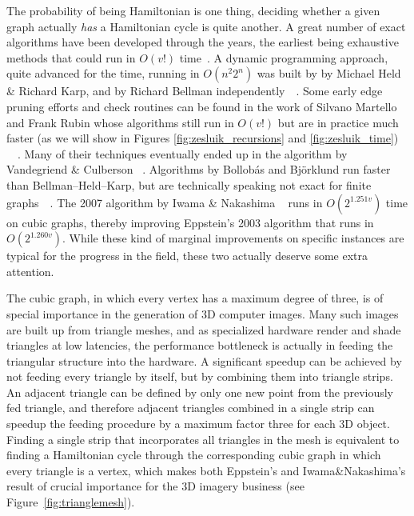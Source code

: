 \documentclass[10pt,conference,compsocconf]{IEEEtran}
\begin{document}
The probability of being Hamiltonian is one thing, deciding whether a given graph actually \textit{has} a Hamiltonian cycle is quite another. A great number of exact algorithms have been developed through the years, the earliest being exhaustive methods that could run in $O(v!)$ time~\cite{roberts1966systematic}. A dynamic programming approach, quite advanced for the time, running in $O(n^2 2^n)$ was built by by Michael Held \& Richard Karp, and by Richard Bellman independently~\cite{held1962dynamic}~\cite{bellman1962dynamic}. Some early edge pruning efforts and check routines can be found in the work of Silvano Martello and Frank Rubin whose algorithms still run in $O(v!)$ but are in practice much faster (as we will show in Figures \ref{fig:zesluik_recursions} and \ref{fig:zesluik_time}) ~\cite{martello1983algorithm}~\cite{rubin1974search}. Many of their techniques eventually ended up in the algorithm by Vandegriend \& Culberson  ~\cite{vandegriend1998gn}. Algorithms by Bollob\'as and Bj\"orklund run faster than Bellman--Held--Karp, but are technically speaking not exact for finite graphs~\cite{bollobas1987algorithm}~\cite{bjorklund2014determinant}. The 2007 algorithm by Iwama \& Nakashima ~\cite{iwama2007improved} runs in $O(2^{1.251v})$ time on cubic graphs, thereby improving Eppstein's 2003 algorithm that runs in $O(2^{1.260v})$. While these kind of marginal improvements on specific instances are typical for the progress in the field, these two actually deserve some extra attention. 

The cubic graph, in which every vertex has a maximum degree of three, is of special importance in the generation of 3D computer images. Many such images are built up from triangle meshes, and as specialized hardware render and shade triangles at low latencies, the performance bottleneck is actually in feeding the triangular structure into the hardware. A significant speedup can be achieved by not feeding every triangle by itself, but by combining them into triangle strips. An adjacent triangle can be defined by only one new point from the previously fed triangle, and therefore adjacent triangles combined in a single strip can speedup the feeding procedure by a maximum factor three for each 3D object. Finding a single strip that incorporates all triangles in the mesh is equivalent to finding a Hamiltonian cycle through the corresponding cubic graph in which every triangle is a vertex, which makes both Eppstein's and Iwama\&Nakashima's result of crucial importance for the 3D imagery business (see Figure~\ref{fig:trianglemesh}). 
\end{document}
